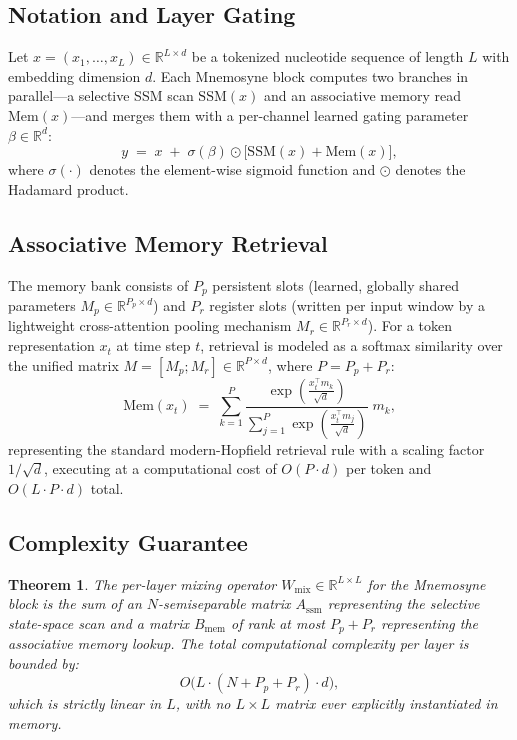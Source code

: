 \documentclass[11pt,a4paper]{article}
\newtheorem{theorem}{Theorem}
\begin{document}
\subsection{Notation and Layer Gating}
Let $x = (x_1,\ldots,x_L) \in \mathbb{R}^{L \times d}$ be a tokenized nucleotide sequence of length $L$ with embedding dimension $d$. Each Mnemosyne block computes two branches in parallel—a selective SSM scan $\mathrm{SSM}(x)$ and an associative memory read $\mathrm{Mem}(x)$—and merges them with a per-channel learned gating parameter $\beta \in \mathbb{R}^d$:
\begin{equation}
y \;=\; x \;+\; \sigma(\beta) \odot \bigl[\mathrm{SSM}(x) + \mathrm{Mem}(x)\bigr],
\label{eq:gate}
\end{equation}
where $\sigma(\cdot)$ denotes the element-wise sigmoid function and $\odot$ denotes the Hadamard product.

\subsection{Associative Memory Retrieval}
The memory bank consists of $P_p$ persistent slots (learned, globally shared parameters $M_p \in \mathbb{R}^{P_p \times d}$) and $P_r$ register slots (written per input window by a lightweight cross-attention pooling mechanism $M_r \in \mathbb{R}^{P_r \times d}$). For a token representation $x_t$ at time step $t$, retrieval is modeled as a softmax similarity over the unified matrix $M = [M_p ; M_r] \in \mathbb{R}^{P \times d}$, where $P = P_p + P_r$:
\begin{equation}
\mathrm{Mem}(x_t) \;=\; \sum_{k=1}^{P} \frac{\exp\left(\frac{x_t^\top m_k}{\sqrt{d}}\right)}{\sum_{j=1}^{P}\exp\left(\frac{x_t^\top m_j}{\sqrt{d}}\right)}\; m_k,
\label{eq:retrieval}
\end{equation}
representing the standard modern-Hopfield retrieval rule with a scaling factor $1/\sqrt{d}$, executing at a computational cost of $O(P \cdot d)$ per token and $O(L \cdot P \cdot d)$ total.

\subsection{Complexity Guarantee}
\begin{theorem}
The per-layer mixing operator $W_{\mathrm{mix}} \in \mathbb{R}^{L \times L}$ for the Mnemosyne block is the sum of an $N$-semiseparable matrix $A_{\mathrm{ssm}}$ representing the selective state-space scan and a matrix $B_{\mathrm{mem}}$ of rank at most $P_p + P_r$ representing the associative memory lookup. The total computational complexity per layer is bounded by:
\[
O\bigl(L \cdot (N + P_p + P_r) \cdot d\bigr),
\]
which is strictly linear in $L$, with no $L \times L$ matrix ever explicitly instantiated in memory.
\end{theorem}
\end{document}
